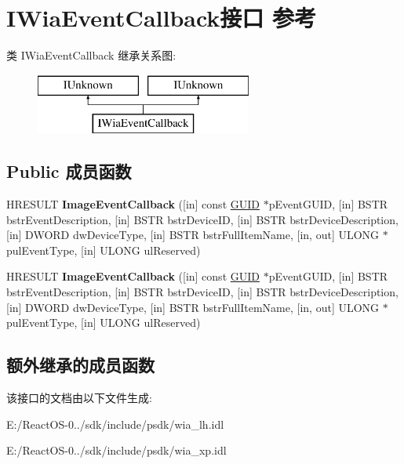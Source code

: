 \hypertarget{interface_i_wia_event_callback}{}\section{I\+Wia\+Event\+Callback接口 参考}
\label{interface_i_wia_event_callback}
类 I\+Wia\+Event\+Callback 继承关系图\+:\begin{figure}[H]
\begin{center}
\leavevmode
\includegraphics[height=2.000000cm]{interface_i_wia_event_callback}
\end{center}
\end{figure}
\subsection*{Public 成员函数}
\begin{DoxyCompactItemize}
\item 
\mbox{\label{interface_i_wia_event_callback_afae7bcaad922f03e346748ee04dbf7c7}} 
H\+R\+E\+S\+U\+LT {\bfseries Image\+Event\+Callback} (\mbox{[}in\mbox{]} const \hyperlink{interface_g_u_i_d}{G\+U\+ID} $\ast$p\+Event\+G\+U\+ID, \mbox{[}in\mbox{]} B\+S\+TR bstr\+Event\+Description, \mbox{[}in\mbox{]} B\+S\+TR bstr\+Device\+ID, \mbox{[}in\mbox{]} B\+S\+TR bstr\+Device\+Description, \mbox{[}in\mbox{]} D\+W\+O\+RD dw\+Device\+Type, \mbox{[}in\mbox{]} B\+S\+TR bstr\+Full\+Item\+Name, \mbox{[}in, out\mbox{]} U\+L\+O\+NG $\ast$pul\+Event\+Type, \mbox{[}in\mbox{]} U\+L\+O\+NG ul\+Reserved)
\item 
\mbox{\label{interface_i_wia_event_callback_afae7bcaad922f03e346748ee04dbf7c7}} 
H\+R\+E\+S\+U\+LT {\bfseries Image\+Event\+Callback} (\mbox{[}in\mbox{]} const \hyperlink{interface_g_u_i_d}{G\+U\+ID} $\ast$p\+Event\+G\+U\+ID, \mbox{[}in\mbox{]} B\+S\+TR bstr\+Event\+Description, \mbox{[}in\mbox{]} B\+S\+TR bstr\+Device\+ID, \mbox{[}in\mbox{]} B\+S\+TR bstr\+Device\+Description, \mbox{[}in\mbox{]} D\+W\+O\+RD dw\+Device\+Type, \mbox{[}in\mbox{]} B\+S\+TR bstr\+Full\+Item\+Name, \mbox{[}in, out\mbox{]} U\+L\+O\+NG $\ast$pul\+Event\+Type, \mbox{[}in\mbox{]} U\+L\+O\+NG ul\+Reserved)
\end{DoxyCompactItemize}
\subsection*{额外继承的成员函数}


该接口的文档由以下文件生成\+:\begin{DoxyCompactItemize}
\item 
E\+:/\+React\+O\+S-\/0../sdk/include/psdk/wia\+\_\+lh.\+idl\item 
E\+:/\+React\+O\+S-\/0../sdk/include/psdk/wia\+\_\+xp.\+idl\end{DoxyCompactItemize}
